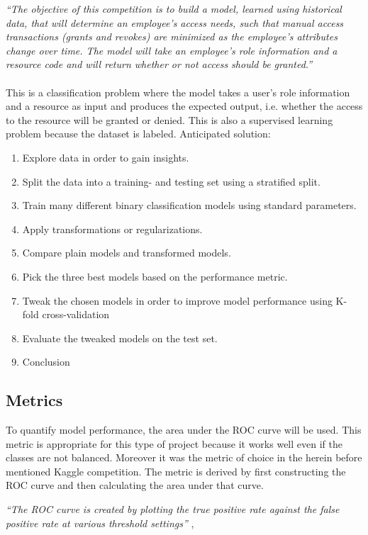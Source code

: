 \documentclass[11pt]{article}
\begin{document}
{\it ``The objective of this competition is to build a model, learned using 
historical data, that
 will determine an employee's access needs, such that manual access transactions 
 (grants and revokes) are minimized as the employee's attributes change over time. 
 The model will take an employee's role information and a resource code and will return whether 
 or not access should be granted.''}
\\ \\
This is a classification problem where the model takes a user's role
information and a resource as input and produces the expected output,
i.e. whether the access to the resource will be granted or denied.
This is also a supervised learning problem because the dataset is labeled. 
Anticipated solution:

\begin{enumerate}
    \item Explore data in order to gain insights.
    \item Split the data into a training- and testing set using 
    a stratified split.
    \item Train many different binary classification models using standard parameters.
    \item Apply transformations or regularizations.
    \item Compare plain models and transformed models.
    \item Pick the three best models based on the performance metric.
    \item Tweak the chosen models in order to improve model performance using
    K-fold cross-validation
    \item Evaluate the tweaked models on the test set.
    \item Conclusion
\end{enumerate}

\subsection{Metrics}

To quantify model performance, the area under the ROC curve will be used.
This metric is appropriate for this type of project because it works well
even if the classes are not balanced. Moreover it was the metric of choice
in the herein before mentioned Kaggle competition.
The metric is derived by first constructing the ROC curve and then 
calculating the area under that curve. 

{\it``The ROC curve is created by plotting the true positive rate against the false 
positive rate at various threshold settings''} \cite{rocCurve},
 
\end{document}
